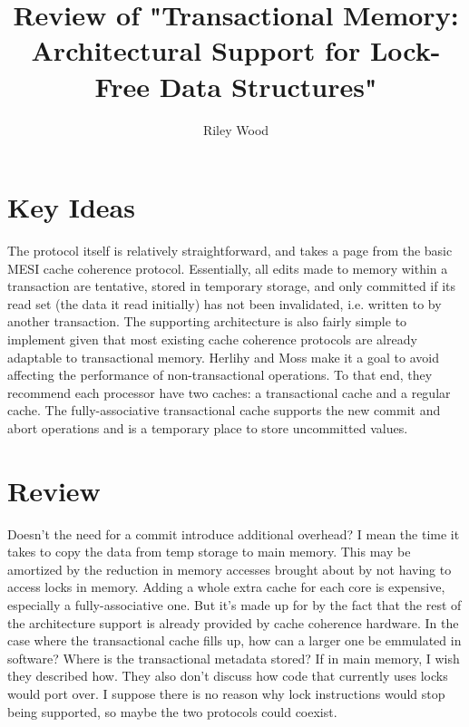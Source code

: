 \documentclass{article}
\title{Review of "Transactional Memory: Architectural Support for Lock-Free Data Structures"\cite{Herlihy:1993}}
\author{Riley Wood}
\begin{document}
\maketitle


\section*{Key Ideas}
The protocol itself is relatively straightforward, and takes a page from the basic MESI cache coherence protocol. Essentially, all edits made to memory within a transaction are tentative, stored in temporary storage, and only committed if its read set (the data it read initially) has not been invalidated, i.e. written to by another transaction. The supporting architecture is also fairly simple to implement given that most existing cache coherence protocols are already adaptable to
transactional memory. Herlihy and Moss make it a goal to avoid affecting the performance of non-transactional operations. To that end, they recommend each processor have two caches: a transactional cache and a regular cache. The fully-associative transactional cache supports the new commit and abort operations and is a temporary place to store uncommitted values.

\section*{Review}
Doesn't the need for a commit introduce additional overhead? I mean the time it takes to copy the data from temp storage to main memory. This may be amortized by the reduction in memory accesses brought about by not having to access locks in memory. Adding a whole extra cache for each core is expensive, especially a fully-associative one. But it's made up for by the fact that the rest of the architecture support is already provided by cache coherence hardware. In the case where the transactional cache fills up, how can a larger one be emmulated in software? Where is the transactional metadata
stored? If in main memory, I wish they described how. They also don't discuss how code that currently uses locks would port over. I suppose there is no reason why lock instructions would stop being supported, so maybe the two protocols could coexist.
\end{document}
